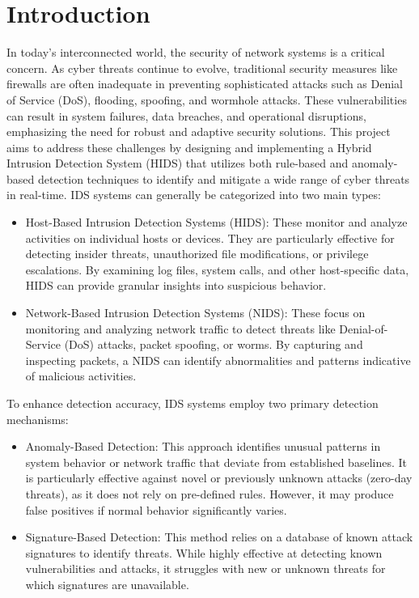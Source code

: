\documentclass[oneside, english]{reports/assets/sdqtechreport}
\begin{document}
\chapter{Introduction}
\label{chap:Introduction}
In today’s interconnected world, the security of network systems is a critical concern. As cyber threats continue to evolve, traditional security measures like firewalls are often inadequate in preventing sophisticated attacks such as Denial of Service (DoS), flooding, spoofing, and wormhole attacks. These vulnerabilities can result in system failures, data breaches, and operational disruptions, emphasizing the need for robust and adaptive security solutions. This project aims to address these challenges by designing and implementing a Hybrid Intrusion Detection System (HIDS) that utilizes both rule-based and anomaly-based detection techniques to identify and mitigate a wide range of cyber threats in real-time.
IDS systems can generally be categorized into two main types:
\begin{itemize}
    \item Host-Based Intrusion Detection Systems (HIDS): These monitor and analyze activities on individual hosts or devices. They are particularly effective for detecting insider threats, unauthorized file modifications, or privilege escalations. By examining log files, system calls, and other host-specific data, HIDS can provide granular insights into suspicious behavior.
    \item Network-Based Intrusion Detection Systems (NIDS): These focus on monitoring and analyzing network traffic to detect threats like Denial-of-Service (DoS) attacks, packet spoofing, or worms. By capturing and inspecting packets, a NIDS can identify abnormalities and patterns indicative of malicious activities.
\end{itemize}
To enhance detection accuracy, IDS systems employ two primary detection mechanisms:
\begin{itemize}
    \item Anomaly-Based Detection: This approach identifies unusual patterns in system behavior or network traffic that deviate from established baselines. It is particularly effective against novel or previously unknown attacks (zero-day threats), as it does not rely on pre-defined rules. However, it may produce false positives if normal behavior significantly varies.
    \item Signature-Based Detection: This method relies on a database of known attack signatures to identify threats. While highly effective at detecting known vulnerabilities and attacks, it struggles with new or unknown threats for which signatures are unavailable.
\end{itemize}
\end{document}
